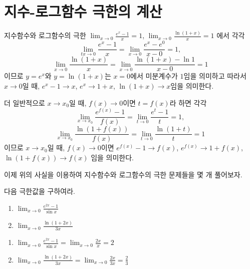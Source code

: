 \documentclass[11pt, a4paper]{book}
\begin{document}
\vskip 10pt
\section{지수-로그함수 극한의 계산}
지수함수와 로그함수의 극한 $\displaystyle\lim_{x\to 0}\frac{e^{x}-1}{x}=1$, $\displaystyle\lim_{x\to 0}\frac{\ln(1+x)}{x}=1$
에서 각각
\[
\displaystyle\lim_{tx\to 0}\frac{e^{x}-1}{x}=\displaystyle\lim_{x\to 0}\frac{e^{x}-e^{0}}{x-0}=1,
\] 
\[
\displaystyle\lim_{x\to 0}\frac{\ln(1+x)}{x}=\displaystyle\lim_{x\to 0}\frac{\ln(1+x)-\ln 1}{x-0}=1
\]
이므로 $y = e^{x}$와 $y =\ln(1+x)$는 $x=0$에서 미분계수가 $1$임을 의미하고 따라서 $x\to0$일 때, $e^{x}-1\to x$, $e^{x}\to 1+x$, $\ln(1+x)\to x$임을 의미한다.


더 일반적으로 $x\to x_{0}$일 때, $f(x)\to0$이면 $t =f(x)$라 하면 각각
\[
\displaystyle\lim_{x\to x_{0}}\frac{e^{f(x)}-1}{f(x)}=\displaystyle\lim_{t\to 0}\frac{e^{t}-1}{t}=1,
\] 
\[
\displaystyle\lim_{x\to x_{0}}\frac{\ln(1+f(x))}{f(x)}=\displaystyle\lim_{t\to 0}\frac{\ln(1+t)}{t}=1
\]
이므로 $x\to x_{0}$일 때, $f(x)\to 0$이면 
$e^{f(x)}-1\to f(x)$, $e^{f(x)}\to 1 +f(x)$, $\ln(1+f(x))\to f(x)$
임을 의미한다.

이제 위의 사실을 이용하여 지수함수와 로그함수의 극한 문제들을 몇 개 풀어보자.
\vskip 10pt
\begin{example}
다음 극한값을 구하여라.
\begin{enumerate}
	\item $\displaystyle\lim_{x\to 0}\frac{e^{2x}-1}{\sin x}$       
	\item $\displaystyle\lim_{x\to 0}\frac{\ln(1+2x)}{3x}$	
\end{enumerate}
\begin{solution}
	\begin{enumerate}
		\item $\displaystyle\lim_{x\to 0}\frac{e^{2x}-1}{\sin x}=\displaystyle\lim_{x\to 0}\frac{2x}{x}=2$
		\item $\displaystyle\lim_{x\to 0}\frac{\ln(1+2x)}{3x}=\displaystyle\lim_{x\to 0}\frac{2x}{3x}=\frac{2}{3}$
	\end{enumerate}
\end{solution}
\end{example}
\vskip 10pt
\end{document}
